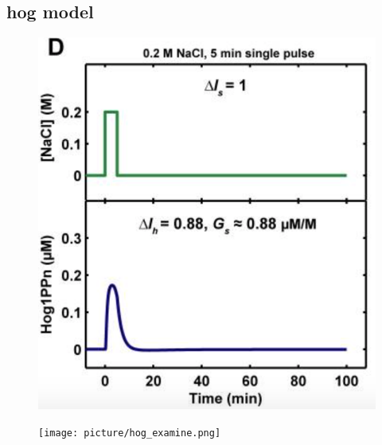 
\subsection{hog model}


\begin{figure}[htbp]
	
	\begin{minipage}{0,5\textwidth}
		
		\includegraphics[width=\textwidth]{picture/Hog_Paper.png}
		
		\label{IonPaddper} 
	\end{minipage}
	\begin{minipage}{0,5\textwidth}
		
		\texttt{[image: picture/hog\_examine.png]}
		
		\label{IonImpdlemented} 
	\end{minipage}
	\caption{}
\end{figure}

